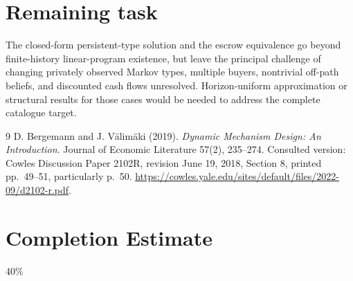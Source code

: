 \documentclass[11pt]{article}
\theoremstyle{remark}
\begin{document}
\section{Remaining task}
The closed-form persistent-type solution and the escrow equivalence go
beyond finite-history linear-program existence, but leave the principal
challenge of changing privately observed Markov types, multiple buyers,
nontrivial off-path beliefs, and discounted cash flows unresolved.
Horizon-uniform approximation or structural results for those cases
would be needed to address the complete catalogue target.
\begin{thebibliography}{9}
 D. Bergemann and J. V\"alim\"aki (2019).
\emph{Dynamic Mechanism Design: An Introduction}.
Journal of Economic Literature 57(2), 235--274.
Consulted version: Cowles Discussion Paper 2102R, revision June 19, 2018,
Section 8, printed pp.~49--51, particularly p.~50.
\url{https://cowles.yale.edu/sites/default/files/2022-09/d2102-r.pdf}.
\end{thebibliography}

\section{Completion Estimate}
40\%
\end{document}
